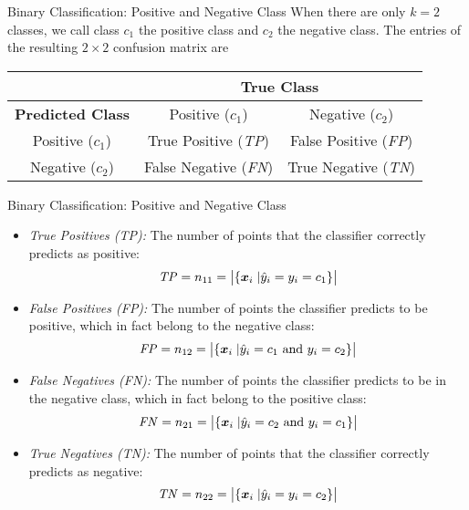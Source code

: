 \begin{frame}{Binary Classif\/{i}cation: Positive and Negative Class}
When there are only $k=2$
classes, we call class $c_1$ the positive class and $c_2$ the
negative class. The entries of the resulting $2 \times 2$
confusion matrix are
\begin{center}
\begin{tabular}{|c|c|c|}
\hline
& \multicolumn{2}{c|}{\textbf{True Class}} \\ \hline
\textbf{Predicted Class} & Positive ($c_1$) & Negative ($c_2$) \\ \hline
Positive ($c_1$)         & True Positive ({\it TP})   &  False Positive ({\it FP})  \\ \hline
Negative ($c_2$)        &  False Negative ({\it FN})  & True Negative ({\it TN})   \\ \hline
\end{tabular}
\end{center}
\end{frame}

\begin{frame}{Binary Classif\/{i}cation: Positive and Negative Class}

\begin{itemize}
  \item \textit{True Positives (TP):}
    The number of points that
    the classif\/{i}er correctly predicts as positive:
  \begin{align*}
    \mathit{TP} = n_{11} = \bigl|\{{\boldsymbol x}_i \;| \hat{y}_i = y_i = c_1\}\bigr|
  \end{align*}

\item \textit{False Positives (FP):}
The number of points the classif\/{i}er
  predicts to be positive, which in fact belong to the negative
  class:
  \begin{align*}
    \mathit{FP} = n_{12} = \bigl|\{{\boldsymbol x}_i\;| \hat{y}_i = c_1 \text{ and } y_i = c_2
    \}\bigr|
  \end{align*}

  \item \textit{False Negatives (FN):}
The number of points the classif\/{i}er
    predicts to be in the negative class, which in fact belong to the
    positive class:
  \begin{align*}
    \mathit{FN} = n_{21} = \bigl|\{{\boldsymbol x}_i\;| \hat{y}_i = c_2 \text{ and } y_i = c_1
    \}\bigr|
  \end{align*}

     \item \textit{True Negatives (TN):}
The number of points that
     the classif\/{i}er correctly predicts as negative:
  \begin{align*}
    \mathit{TN} = n_{22} = \bigl|\{{\boldsymbol x}_i \;| \hat{y}_i = y_i = c_2\}\bigr|
  \end{align*}
\end{itemize}
\end{frame}


